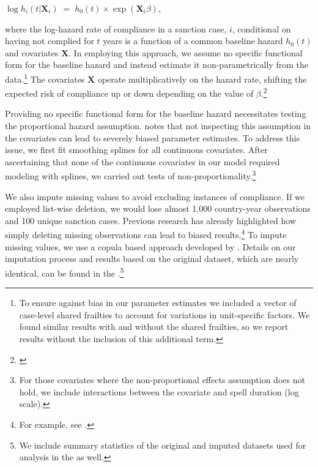 \begin{center}
	$\log h_{i}(t | \boldsymbol{X}_{i}) \; = \; h_{0}(t) \times \exp(\boldsymbol{X}_{i} \beta)$,
\end{center}

where the log-hazard rate of compliance in a sanction case, $i$, conditional on having not complied for $t$ years is a function of a common baseline hazard $h_{0}(t)$ and covariates $\boldsymbol{X}$. In employing this approach, we assume no specific functional form for the baseline hazard and instead estimate it non-parametrically from the data.\footnote{To ensure against bias in our parameter estimates we included a vector of case-level shared frailties to account for variations in unit-specific factors. We found similar results with and without the shared frailties, so we report results without the inclusion of this additional term.}  The covariates $\boldsymbol{X}$ operate multiplicatively on the hazard rate, shifting the expected risk of compliance up or down depending on the value of $\beta$.\footnote{\cite{crespo2013political}}

Providing no specific functional form for the baseline hazard necessitates testing the proportional hazard assumption. \citet{keele2010proportionally} notes that not inspecting this assumption in the covariates can lead to severely biased parameter estimates. To address this issue, we first fit smoothing splines for all continuous covariates. After ascertaining that none of the continuous covariates in our model required modeling with splines, we carried out tests of non-proportionality.\footnote{For those covariates where the non-proportional effects assumption does not hold, we include interactions between the covariate and spell duration (log scale).} 

We also impute missing values to avoid excluding instances of compliance. If we employed list-wise deletion, we would lose almost 1,000 country-year observations and 100 unique sanction cases. Previous research has already highlighted how simply deleting missing observations can lead to biased results.\footnote{For example, see \citealp{rubin1976inference,honaker2010missing}.} To impute missing values, we use a copula based approach developed by \citet{hoff:2007}. Details on our imputation process and results based on the original dataset, which are nearly identical, can be found in the .\footnote{We include summary statistics of the original and imputed datasets used for analysis in the  as well. } 

